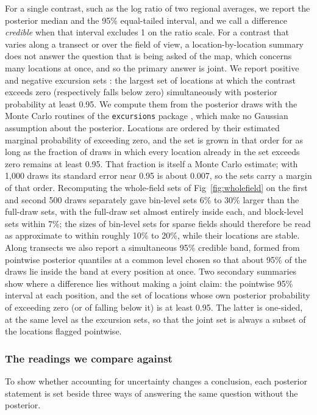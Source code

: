\documentclass[10pt,letterpaper]{article}
\begin{document}
For a single contrast, such as the log ratio of two regional averages, we report the posterior median and the 95\% equal-tailed interval, and we call a difference \textit{credible} when that interval excludes 1 on the ratio scale. For a contrast that varies along a transect or over the field of view, a location-by-location summary does not answer the question that is being asked of the map, which concerns many locations at once, and so the primary answer is joint. We report positive and negative excursion sets \cite{bolin2015excursion}: the largest set of locations at which the contrast exceeds zero (respectively falls below zero) simultaneously with posterior probability at least 0.95. We compute them from the posterior draws with the Monte Carlo routines of the \texttt{excursions} package \cite{bolin2018excursions}, which make no Gaussian assumption about the posterior. Locations are ordered by their estimated marginal probability of exceeding zero, and the set is grown in that order for as long as the fraction of draws in which every location already in the set exceeds zero remains at least 0.95. That fraction is itself a Monte Carlo estimate; with 1,000 draws its standard error near 0.95 is about 0.007, so the sets carry a margin of that order. Recomputing the whole-field sets of Fig~\ref{fig:wholefield} on the first and second 500 draws separately gave bin-level sets 6\% to 30\% larger than the full-draw sets, with the full-draw set almost entirely inside each, and block-level sets within 7\%; the sizes of bin-level sets for sparse fields should therefore be read as approximate to within roughly 10\% to 20\%, while their locations are stable. Along transects we also report a simultaneous 95\% credible band, formed from pointwise posterior quantiles at a common level chosen so that about 95\% of the draws lie inside the band at every position at once. Two secondary summaries show where a difference lies without making a joint claim: the pointwise 95\% interval at each position, and the set of locations whose own posterior probability of exceeding zero (or of falling below it) is at least 0.95. The latter is one-sided, at the same level as the excursion sets, so that the joint set is always a subset of the locations flagged pointwise.

\subsubsection*{The readings we compare against}

To show whether accounting for uncertainty changes a conclusion, each posterior statement is set beside three ways of answering the same question without the posterior.
\end{document}
